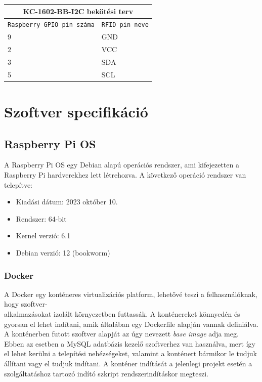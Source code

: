 \documentclass[11pt, a4paper]{article}
\begin{document}
		\begin{minipage}{.5\textwidth}
			\fontsize{10}{16}\selectfont
			\centering
			\begin{tabular}{||m{6em} m{8em}||}
				\hline
				\multicolumn{2}{|c|}{\textbf{KC-1602-BB-I2C bekötési terv}} \\
				\hline
				\texttt{Raspberry GPIO pin száma} & \texttt{RFID pin neve} \\
				\hline\hline
				9 & GND \\ 
				\hline
				2 & VCC \\ 
				\hline
				3 & SDA \\ 
				\hline
				5 & SCL \\
				\hline
			\end{tabular}
			\label{table:lcdconnections}
		\end{minipage}
		\vfill
		
	\section{Szoftver specifikáció}
		\subsection{Raspberry Pi OS}
			\begin{flushleft}
				\justifying
				A Raspberry Pi OS egy Debian alapú operációs rendszer, ami kifejezetten a Raspberry Pi hardverekhez lett létrehozva. A következő operáció rendszer van telepítve:
				\begin{itemize}
					\item Kiadási dátum: 2023 október 10.
					\item Rendszer: 64-bit
					\item Kernel verzió: 6.1
					\item Debian verzió: 12 (bookworm)
				\end{itemize}

			\end{flushleft}
		\subsubsection{Docker}
			\begin{flushleft}
				\justifying
				A Docker egy konténeres virtualizációs platform, lehetővé teszi a felhasználóknak, hogy szoftver-\\alkalmazásokat izolált környezetben futtassák. A konténereket könnyedén és gyorsan el lehet indítani, amik általában egy Dockerfile alapján vannak definiálva. A konténerben futott szoftver alapját az úgy nevezett \emph{base image} adja meg. Ebben az esetben a MySQL adatbázis kezelő szoftverhez van használva, mert így el lehet kerülni a telepítési nehézségeket, valamint a konténert bármikor le tudjuk állítani vagy el tudjuk indítani. A konténer indítását a jelenlegi projekt esetén a szolgáltatáshoz tartozó indító szkript rendszerindításkor megteszi.
			\end{flushleft}
\end{document}
